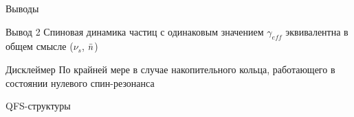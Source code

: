 \documentclass[14pt]{beamer}
\newcommand{\gef}{\gamma_{eff}}
\begin{document}
\begin{frame}{Выводы}
	\begin{block}{Вывод 2}
		Спиновая динамика частиц с одинаковым значением $\gef$ эквивалентна в общем смысле ($\nu_s$, $\bar n$)
	\end{block}
	\pause
	\begin{alertblock}{Дисклеймер}
		По крайней мере в случае накопительного кольца, работающего в состоянии нулевого спин-резонанса
	\end{alertblock}
\end{frame}
\begin{frame}{QFS-структуры}
\end{frame}
\end{document}
